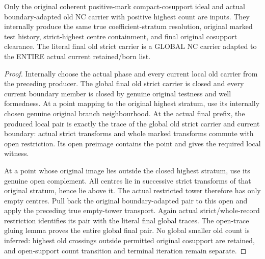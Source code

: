\begin{theorem}
\label{hir:nc-original-coefficient-phase-global-old-born-carrier}
\leanok
Only the original coherent positive-mark compact-cosupport ideal and actual
boundary-adapted old NC carrier with positive highest count are inputs.
They internally produce the same true coefficient-stratum resolution,
original marked test history, strict-highest centre containment, and final
original cosupport clearance. The literal final old strict carrier is a
GLOBAL NC carrier adapted to the ENTIRE actual current retained/born list.
\end{theorem}
\begin{proof}
Internally choose the actual phase and every current local old carrier from
the preceding producer. The global final old strict carrier is closed and
every current boundary member is closed by genuine original testness and
well formedness. At a point mapping to the original highest stratum, use
its internally chosen genuine original branch neighbourhood. At the actual
final prefix, the produced local pair is exactly the trace of the global
old strict carrier and current boundary: actual strict transforms and whole
marked transforms commute with open restriction. Its open preimage contains
the point and gives the required local witness.

At a point whose original image lies outside the closed highest stratum,
use its genuine open complement. All centres lie in successive strict
transforms of that original stratum, hence lie above it. The actual
restricted tower therefore has only empty centres. Pull back the original
boundary-adapted pair to this open and apply the preceding true empty-tower
transport. Again actual strict/whole-record restriction identifies its pair
with the literal final global traces. The open-trace gluing lemma proves
the entire global final pair. No global smaller old count is inferred:
highest old crossings outside permitted original cosupport are retained,
and open-support count transition and terminal iteration remain separate.
\end{proof}
